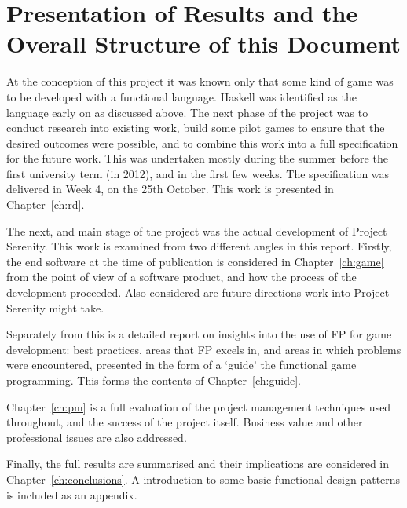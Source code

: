 \section{Presentation of Results and the Overall Structure of this Document}

At the conception of this project it was known only that some kind of game was to be developed with a functional language. Haskell was identified as the language early on as discussed above. The next phase of the project was to conduct research into existing work, build some pilot games to ensure that the desired outcomes were possible, and to combine this work into a full specification for the future work. This was undertaken mostly during the summer before the first university term (in 2012), and in the first few weeks. The specification was delivered in Week 4, on the 25th October. This work is presented in Chapter~\ref{ch:rd}.

The next, and main stage of the project was the actual development of Project Serenity. This work is examined from two different angles in this report. Firstly, the end software at the time of publication is considered in Chapter~\ref{ch:game} from the point of view of a software product, and how the process of the development proceeded. Also considered are future directions work into Project Serenity might take. 

Separately from this is a detailed report on insights into the use of FP for game development: best practices, areas that FP excels in, and areas in which problems were encountered, presented in the form of a `guide' the functional game programming. This forms the contents of Chapter~\ref{ch:guide}.

Chapter~\ref{ch:pm} is a full evaluation of the project management techniques used throughout, and the success of the project itself. Business value and other professional issues are also addressed.

Finally, the full results are summarised and their implications are considered in Chapter~\ref{ch:conclusions}. A introduction to some basic functional design patterns is included as an appendix.